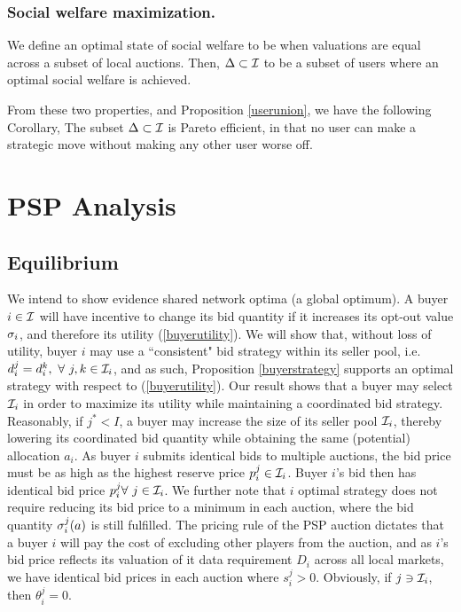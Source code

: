 \subsubsection{Social welfare maximization.}
We define an optimal state of social welfare to be when valuations are equal
across a subset of local auctions. Then, $\Delta\subset \mathcal{I}$ to be a subset of
users where an optimal social welfare is achieved.  

From these two properties, and Proposition \ref{userunion}, we have the
following Corollary, 
{
    The subset $\Delta\subset \mathcal{I}$ is Pareto efficient, in that no user can
    make a strategic move without making any other user worse off.
}

\section{PSP Analysis}\label{analysis}


\subsection{Equilibrium}

We intend to show evidence shared network optima (a
global optimum). 
A buyer $i\in\mathcal{I}$ will have incentive to change its bid
quantity if it increases its opt-out value $\sigma_i$, and therefore its utility (\ref{buyerutility}). 
We will show that, without loss of utility, buyer $i$ may  
use a ``consistent" bid strategy within its seller pool, i.e. $d_i^j = d_i^k, \
\forall \ j,k \in \mathcal{I}_i$, and as such,
Proposition \ref{buyerstrategy} supports an optimal strategy with respect to
(\ref{buyerutility}). 
Our result shows that a buyer may select $\mathcal{I}_i$ in order to maximize its
utility while maintaining a coordinated bid strategy. 
Reasonably, if $j^*< I$, a buyer may increase the size of its seller pool
$\mathcal{I}_i$, thereby lowering its coordinated bid
quantity while obtaining the same (potential) allocation $a_i$. 
As buyer $i$ submits identical bids to multiple auctions, the bid price must be
as high as the highest reserve price $p_i^j \in \mathcal{I}_i$.
Buyer $i$'s bid then has identical bid price $p_i^j \forall \ j \in\mathcal{I}_i$. 
We further note that $i$ optimal strategy does not require reducing its bid price to a
minimum in each auction, where
the bid quantity $\sigma_i^j(a)$ is still fulfilled. The pricing rule of the PSP
auction dictates that a buyer $i$ will pay the cost of excluding other players from
the auction, and as $i$'s bid price reflects its valuation of it data
requirement $D_i$ across all local markets, we have identical bid prices in
each auction where $s_i^j>0$. Obviously, if $j\ni\mathcal{I}_i$, then $\theta_i^j = 0$.

